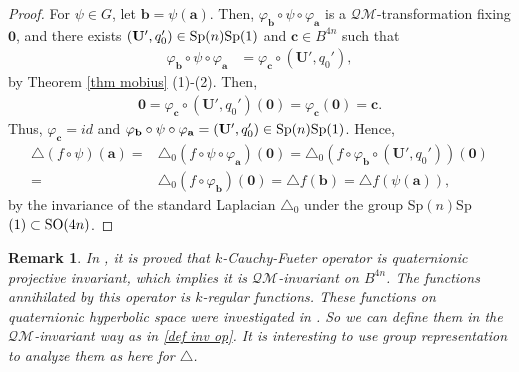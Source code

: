 \documentclass[a4paper,11pt]{amsart}
\numberwithin{equation}{section}
\newtheorem{rem}{Remark}[section]
\begin{document}
\begin{proof}
For $\psi\in G$, let $\mathbf{b}=\psi(\mathbf{a})$. Then, $\varphi_{\mathbf{b}}\circ\psi\circ\varphi_{\mathbf{a}}$ is a $\mathcal{QM}$-transformation fixing $\mathbf{0}$, and there exists $(\mathbf{U}',q_0')\in {\rm Sp}(n){\rm Sp}(1)$ and $\mathbf{c}\in B^{4n}$ such that
\begin{equation*}\begin{aligned}
\varphi_{\mathbf{b}}\circ\psi\circ\varphi_{\mathbf{a}}&=\varphi_{\mathbf{c}}\circ (\mathbf{U}',q_0'),
\end{aligned}\end{equation*}
by Theorem \ref{thm mobius} (1)-(2). Then,
\begin{equation*}\begin{aligned}
\mathbf{0}=\varphi_{\mathbf{c}}\circ (\mathbf{U}',q_0')(\mathbf{0})=\varphi_{\mathbf{c}}(\mathbf{0})=\mathbf{c}.
\end{aligned}\end{equation*}
Thus, $\varphi_{\mathbf{c}}=id$ and $\varphi_{\mathbf{b}}\circ\psi\circ\varphi_{\mathbf{a}}= (\mathbf{U}',q_0')\in {\rm Sp}(n){\rm Sp}(1)$.
Hence,
\begin{equation*}\begin{aligned}
\triangle(f\circ\psi)(\mathbf{a})=&\triangle_0 (f\circ\psi\circ\varphi_{\mathbf{a}})(\mathbf{0})=\triangle_0 (f\circ\varphi_{\mathbf{b}}\circ (\mathbf{U}',q_0'))(\mathbf{0})\\
=&\triangle_0 (f\circ\varphi_{\mathbf{b}})(\mathbf{0})=\triangle f(\mathbf{b})=\triangle f(\psi(\mathbf{a})),
\end{aligned}\end{equation*}
 by the invariance of the standard Laplacian $\triangle_0$ under the group Sp$(n)$Sp$(1)\subset{\rm SO}(4n)$.
\end{proof}
\begin{rem}
In \cite{wang4}, it is proved that $k$-Cauchy-Fueter operator is quaternionic projective invariant, which implies it is $\mathcal{QM}$-invariant on $B^{4n}$. The functions annihilated by this operator is $k$-regular functions. These functions on quaternionic hyperbolic space were investigated in \cite{Chang3,CHANG,hr}. So we can define them in the $\mathcal{QM}$-invariant way as in \eqref{def inv op}. It is interesting to use group representation to analyze them as here for $\triangle$.
\end{rem}
\end{document}
